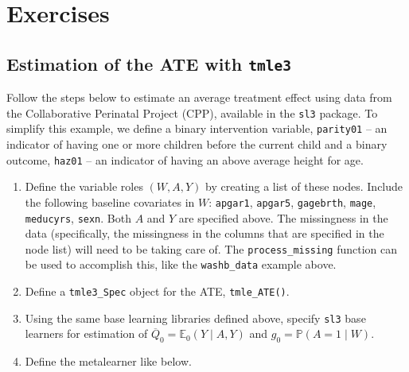 \documentclass[12pt, krantz2,]{book}
\newenvironment{Shaded}{\begin{snugshade}}{\end{snugshade}}
\newcommand{\CommentTok}[1]{\textcolor[rgb]{0.56,0.35,0.01}{\textit{#1}}}
\newcommand{\DataTypeTok}[1]{\textcolor[rgb]{0.13,0.29,0.53}{#1}}
\newcommand{\DecValTok}[1]{\textcolor[rgb]{0.00,0.00,0.81}{#1}}
\newcommand{\KeywordTok}[1]{\textcolor[rgb]{0.13,0.29,0.53}{\textbf{#1}}}
\newcommand{\NormalTok}[1]{#1}
\newcommand{\OperatorTok}[1]{\textcolor[rgb]{0.81,0.36,0.00}{\textbf{#1}}}
\newcommand{\StringTok}[1]{\textcolor[rgb]{0.31,0.60,0.02}{#1}}
\providecommand{\tightlist}{%
  \setlength{\itemsep}{0pt}\setlength{\parskip}{0pt}}
\theoremstyle{definition}
\theoremstyle{definition}
\theoremstyle{definition}
\newcommand{\1}{\mathbbm{1}}
\begin{document}
\hypertarget{exercises-1}{%
\section{Exercises}\label{exercises-1}}

\hypertarget{tmle3-ex1}{%
\subsection{\texorpdfstring{Estimation of the ATE with \texttt{tmle3}}{Estimation of the ATE with tmle3}}\label{tmle3-ex1}}

Follow the steps below to estimate an average treatment effect using data from
the Collaborative Perinatal Project (CPP), available in the \texttt{sl3} package. To
simplify this example, we define a binary intervention variable, \texttt{parity01} --
an indicator of having one or more children before the current child and a
binary outcome, \texttt{haz01} -- an indicator of having an above average height for
age.

\begin{Shaded}
\end{Shaded}

\begin{enumerate}
\def\labelenumi{\arabic{enumi}.}
\tightlist
\item
  Define the variable roles \((W,A,Y)\) by creating a list of these nodes.
  Include the following baseline covariates in \(W\): \texttt{apgar1}, \texttt{apgar5},
  \texttt{gagebrth}, \texttt{mage}, \texttt{meducyrs}, \texttt{sexn}. Both \(A\) and \(Y\) are specified
  above. The missingness in the data (specifically, the missingness in the
  columns that are specified in the node list) will need to be taking care of.
  The \texttt{process\_missing} function can be used to accomplish this, like the
  \texttt{washb\_data} example above.
\item
  Define a \texttt{tmle3\_Spec} object for the ATE, \texttt{tmle\_ATE()}.
\item
  Using the same base learning libraries defined above, specify \texttt{sl3} base
  learners for estimation of \(\overline{Q}_0 = \mathbb{E}_0(Y \mid A,Y)\) and
  \(g_0 = \mathbb{P}(A = 1 \mid W)\).
\item
  Define the metalearner like below.
\end{enumerate}
\end{document}
